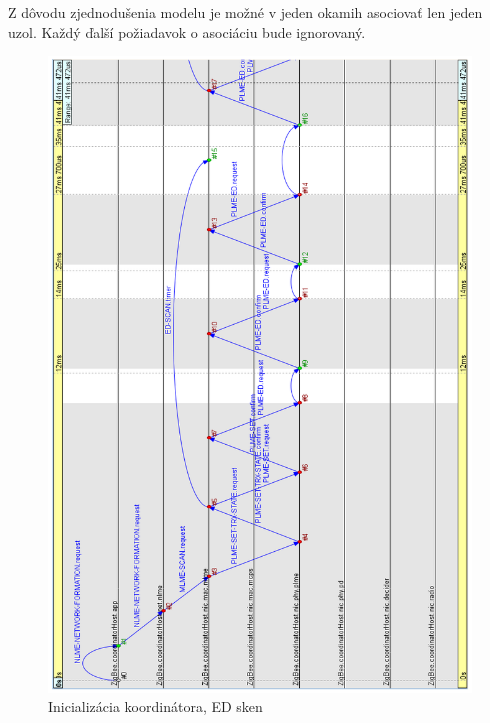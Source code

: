 \indent Z dôvodu zjednodušenia modelu je možné v jeden okamih asociovať len jeden uzol. Každý ďalší požiadavok o asociáciu bude ignorovaný.\\

\begin{figure}[htbp]
\begin{center}
\includegraphics[width=140mm]{figures/chart_init}
\caption{Inicializácia koordinátora, ED sken}
\label{fig:chart_init}
\end{center}
\end{figure}

